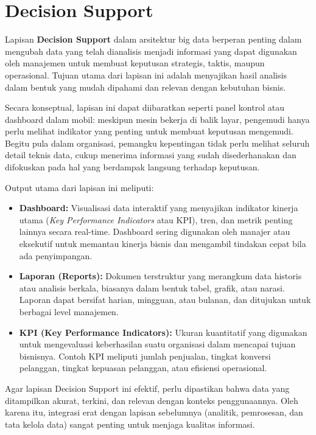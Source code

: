 \section{Decision Support}

Lapisan \textbf{Decision Support} dalam arsitektur big data berperan penting dalam mengubah data yang telah dianalisis menjadi informasi yang dapat digunakan oleh manajemen untuk membuat keputusan strategis, taktis, maupun operasional. Tujuan utama dari lapisan ini adalah menyajikan hasil analisis dalam bentuk yang mudah dipahami dan relevan dengan kebutuhan bisnis.

Secara konseptual, lapisan ini dapat diibaratkan seperti panel kontrol atau dashboard dalam mobil: meskipun mesin bekerja di balik layar, pengemudi hanya perlu melihat indikator yang penting untuk membuat keputusan mengemudi. Begitu pula dalam organisasi, pemangku kepentingan tidak perlu melihat seluruh detail teknis data, cukup menerima informasi yang sudah disederhanakan dan difokuskan pada hal yang berdampak langsung terhadap keputusan.

Output utama dari lapisan ini meliputi:

\begin{itemize}
	\item \textbf{Dashboard:} Visualisasi data interaktif yang menyajikan indikator kinerja utama (\textit{Key Performance Indicators} atau KPI), tren, dan metrik penting lainnya secara real-time. Dashboard sering digunakan oleh manajer atau eksekutif untuk memantau kinerja bisnis dan mengambil tindakan cepat bila ada penyimpangan.
	
	\item \textbf{Laporan (Reports):} Dokumen terstruktur yang merangkum data historis atau analisis berkala, biasanya dalam bentuk tabel, grafik, atau narasi. Laporan dapat bersifat harian, mingguan, atau bulanan, dan ditujukan untuk berbagai level manajemen.
	
	\item \textbf{KPI (Key Performance Indicators):} Ukuran kuantitatif yang digunakan untuk mengevaluasi keberhasilan suatu organisasi dalam mencapai tujuan bisnisnya. Contoh KPI meliputi jumlah penjualan, tingkat konversi pelanggan, tingkat kepuasan pelanggan, atau efisiensi operasional.
\end{itemize}

Agar lapisan Decision Support ini efektif, perlu dipastikan bahwa data yang ditampilkan akurat, terkini, dan relevan dengan konteks penggunaannya. Oleh karena itu, integrasi erat dengan lapisan sebelumnya (analitik, pemrosesan, dan tata kelola data) sangat penting untuk menjaga kualitas informasi.

